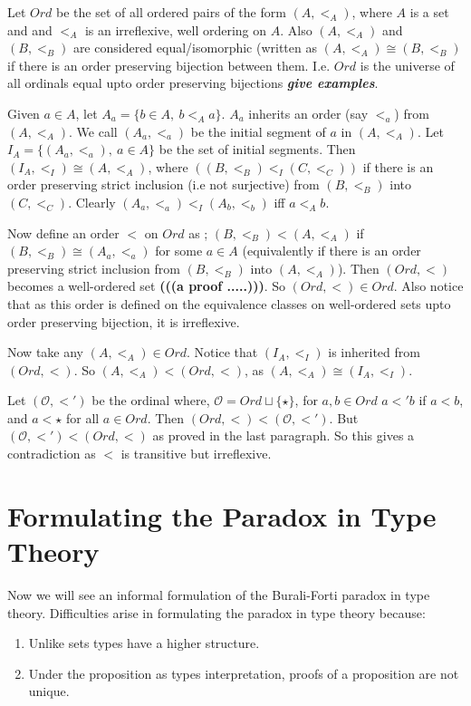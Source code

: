 \documentclass[10pt]{article}
\theoremstyle{definition}
\theoremstyle{plain}
\theoremstyle{remark}
\begin{document}
Let $Ord$ be the set of all ordered pairs of the form $(A, <_A)$, where $A$ is a set and
and $<_A$ is an irreflexive, well ordering on $A$. Also $(A, <_A)$ and $(B, <_B)$ are 
considered equal/isomorphic (written as $(A,<_A) \cong (B,<_B)$ if there is an order 
preserving bijection between them. I.e. $Ord$ is the universe of all ordinals equal upto 
order preserving bijections \textbf{\textit{give examples}}.\smallskip

Given $a\in A$, let $A_a = \{b \in A,\ b <_A a \}$. $A_a$ inherits an order (say $<_a$)
from $(A, <_A)$. We call $(A_a, <_a)$ be the initial segment of $a$ in $(A, <_A)$. Let
$I_A = \{(A_a, <_a),\ a\in A\}$ be the set of initial segments. Then 
$(I_A,<_I) \cong (A, <_A)$, where $((B,<_B) <_I (C,<_C))$ if there is an order preserving 
strict inclusion (i.e not surjective) from $(B,<_B)$ into $(C,<_C)$. Clearly 
$(A_a,<_a) <_I (A_b,<_b)$ iff $a <_A b$.\smallskip

Now define an order $<$ on $Ord$ as ; $(B,<_B) < (A, <_A)$ if $(B, <_B) \cong (A_a, <_a)$ 
for some $a \in A$ (equivalently if there is an order preserving strict inclusion 
from $(B,<_B)$ into $(A,<_A)$). Then $(Ord, <)$ becomes a well-ordered set 
\textbf{(((a proof .....)))}. So $(Ord, <) \in Ord$. Also notice that as this order is defined 
on the equivalence classes on well-ordered sets upto order preserving bijection, it is 
irreflexive.\smallskip

Now take any $(A, <_A)\in Ord$. Notice that $(I_A, <_I)$ is inherited from ${(Ord, <)}$. So
$(A, <_A) < (Ord, <)$, as $(A,<_A) \cong (I_A, <_I)$.\smallskip

Let $(\mathcal{O}, <')$ be the ordinal where, $\mathcal{O} = Ord\sqcup \{\star\}$, for 
$a,b\in Ord$ $a<'b$ if $a<b$, and $a<\star$ for all $a\in Ord$. Then 
$(Ord,<)< (\mathcal{O},<')$. But $(\mathcal{O},<')<(Ord,<)$ as proved in the last paragraph.
So this gives a contradiction as $<$ is transitive but irreflexive. 

\section{Formulating the Paradox in Type Theory}\label{S:Form in TT}

Now we will see an informal formulation of the Burali-Forti paradox in type theory. 
Difficulties arise in formulating the paradox in type theory because:
\begin{enumerate}
\item Unlike sets types have a higher structure.
\item Under the proposition as types interpretation, proofs of a proposition are not unique.
\end{enumerate}
\end{document}
